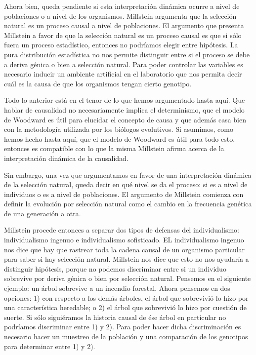 Ahora bien, queda pendiente si esta interpretación dinámica ocurre a nivel de poblaciones o a nivel de los organismos. Millstein \citeyear{Millstein2006} argumenta que la selección natural es un proceso causal a nivel de poblaciones. El argumento que presenta Millstein a favor de que la selección natural es un proceso causal es que si sólo fuera un proceso estadístico, entonces no podríamos elegir entre hipótesis. La pura distribución estadística no nos permite distinguir entre si el proceso se debe a deriva génica o bien a selección natural. Para poder controlar las variables es necesario inducir un ambiente artificial en el laboratorio que nos permita decir cuál es la causa de que los organismos tengan cierto genotipo.

Todo lo anterior está en el tenor de lo que hemos argumentado hasta aquí. Que hablar de causalidad no necesariamente implica el determinismo, que el modelo de Woodward es útil para elucidar el concepto de causa y que además casa bien con la metodología utilizada por los biólogos evolutivos. Si asumimos, como hemos hecho hasta aquí, que el modelo de Woodward es útil para todo esto, entonces es compatible con lo que la misma Millstein afirma acerca de la interpretación dinámica de la causalidad.

Sin embargo, una vez que argumentamos en favor de una interpretación dinámica de la selección natural, queda decir en qué nivel se da el proceso: si es a nivel de individuos o es a nivel de poblaciones. El argumento de Millstein comienza con definir la evolución por selección natural como el cambio en la frecuencia genética de una generación a otra.

Millstein procede entonces a separar dos tipos de defensas del individualismo: individualismo ingenuo e individualismo sofisticado. EL individualismo ingenuo nos dice que hay que rastrear toda la cadena causal de un organismo particular para saber si hay selección natural. Millstein nos dice que esto no nos ayudaría a distinguir hipótesis, porque no podemos discriminar entre si un individuo sobrevive por deriva génica o bien por selección natural. Pensemos en el siguiente ejemplo: un árbol sobrevive a un incendio forestal. Ahora pensemos en dos opciones: 1) con respecto a los demás árboles, el árbol que sobrevivió lo hizo por una característica heredable; o 2) el árbol que sobrevivió lo hizo por cuestión de suerte. Si sólo siguiéramos la historia causal de ése árbol en particular no podríamos discriminar entre 1) y 2). Para poder hacer dicha discriminación es necesario hacer un muestreo de la población y una comparación de los genotipos para determinar entre 1) y 2).

